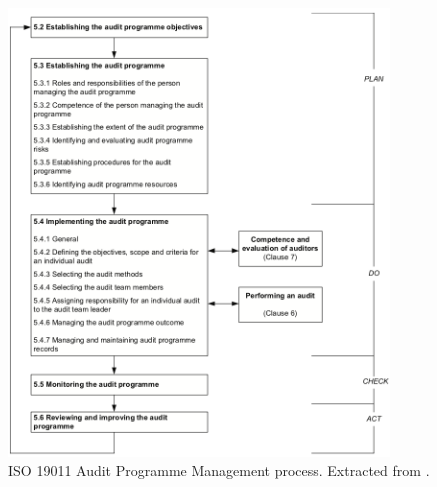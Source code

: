 \begin{figure}[h!]
\centering
\includegraphics[width=0.9\textwidth]{img/ISO19011AuditProcess.png}
\caption{ISO 19011 Audit Programme Management process. Extracted from \cite{ISO19011}.}
\end{figure}




